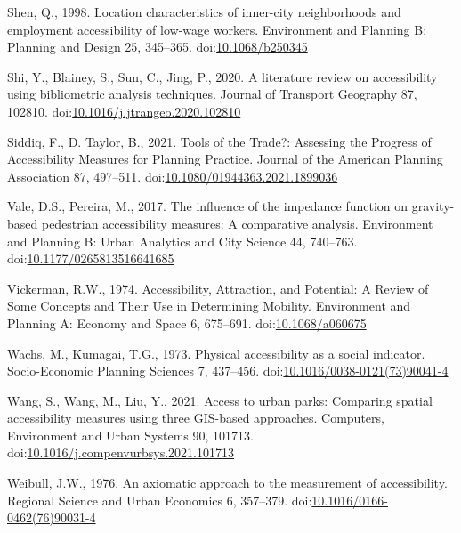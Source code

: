\documentclass[]{elsarticle} %
\newlength{\cslhangindent}
\newlength{\cslentryspacingunit} %
\newenvironment{CSLReferences}[2] %
 {%
  \setlength{\parindent}{0pt}
  \ifodd #1
  \let\oldpar\par
  \def\par{\hangindent=\cslhangindent\oldpar}
  \fi
  \setlength{\parskip}{#2\cslentryspacingunit}
 }%
 {}
\begin{document}
\begin{CSLReferences}{1}{0}
\leavevmode{}%
Shen, Q., 1998. Location characteristics of inner-city neighborhoods and
employment accessibility of low-wage workers. Environment and Planning
B: Planning and Design 25, 345--365.
doi:\href{https://doi.org/10.1068/b250345}{10.1068/b250345}

\leavevmode{}%
Shi, Y., Blainey, S., Sun, C., Jing, P., 2020. A literature review on
accessibility using bibliometric analysis techniques. Journal of
Transport Geography 87, 102810.
doi:\href{https://doi.org/10.1016/j.jtrangeo.2020.102810}{10.1016/j.jtrangeo.2020.102810}

\leavevmode{}%
Siddiq, F., D. Taylor, B., 2021. Tools of the {Trade}?: {Assessing} the
{Progress} of {Accessibility} {Measures} for {Planning} {Practice}.
Journal of the American Planning Association 87, 497--511.
doi:\href{https://doi.org/10.1080/01944363.2021.1899036}{10.1080/01944363.2021.1899036}

\leavevmode{}%
Vale, D.S., Pereira, M., 2017. The influence of the impedance function
on gravity-based pedestrian accessibility measures: {A} comparative
analysis. Environment and Planning B: Urban Analytics and City Science
44, 740--763.
doi:\href{https://doi.org/10.1177/0265813516641685}{10.1177/0265813516641685}

\leavevmode{}%
Vickerman, R.W., 1974. Accessibility, {Attraction}, and {Potential}: {A}
{Review} of {Some} {Concepts} and {Their} {Use} in {Determining}
{Mobility}. Environment and Planning A: Economy and Space 6, 675--691.
doi:\href{https://doi.org/10.1068/a060675}{10.1068/a060675}

\leavevmode{}%
Wachs, M., Kumagai, T.G., 1973. Physical accessibility as a social
indicator. Socio-Economic Planning Sciences 7, 437--456.
doi:\href{https://doi.org/10.1016/0038-0121(73)90041-4}{10.1016/0038-0121(73)90041-4}

\leavevmode{}%
Wang, S., Wang, M., Liu, Y., 2021. Access to urban parks: {Comparing}
spatial accessibility measures using three {GIS}-based approaches.
Computers, Environment and Urban Systems 90, 101713.
doi:\href{https://doi.org/10.1016/j.compenvurbsys.2021.101713}{10.1016/j.compenvurbsys.2021.101713}

\leavevmode{}%
Weibull, J.W., 1976. An axiomatic approach to the measurement of
accessibility. Regional Science and Urban Economics 6, 357--379.
doi:\href{https://doi.org/10.1016/0166-0462(76)90031-4}{10.1016/0166-0462(76)90031-4}


\end{CSLReferences}
\end{document}
